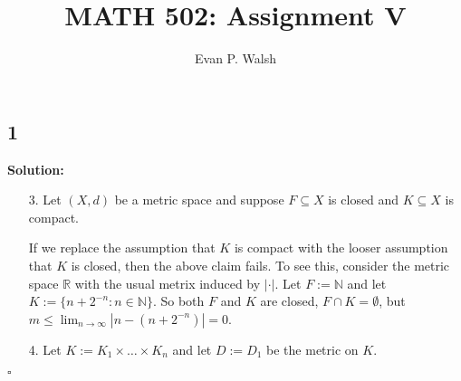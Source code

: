 \documentclass[12pt]{article}
\title{MATH 502: Assignment V}
\author{Evan P. Walsh}
\newcounter{ProofCounter}
\newcounter{ClaimCounter}[ProofCounter]
\newenvironment{Solution}{\stepcounter{ProofCounter}\textbf{Solution:}}{\hfill$\square$}
\newenvironment{claim}[1]{\vspace{1mm}\stepcounter{ClaimCounter}\par\noindent\underline{\bf Claim \theClaimCounter:}\space#1}{}
\newenvironment{claimproof}[1]{\par\noindent\underline{Proof of claim \theClaimCounter:}\space#1}{\hfill $\blacksquare$ Claim \theClaimCounter}
\begin{document}
\maketitle


\subsection*{1}
\begin{Solution}
  \begin{enumerate}
    \item[3.] Let $(X,d)$ be a metric space and suppose $F \subseteq X$ is closed and $K \subseteq X$ is compact.
      

      If we replace the assumption that $K$ is compact with the looser assumption that $K$ is closed, then the above claim fails. To see this,
      consider the metric space $\mathbb{R}$ with the usual metrix induced by $|\cdot |$. Let $F := \mathbb{N}$ and let $K := \{n + 2^{-n}: n \in
      \mathbb{N}\}$. So both $F$ and $K$ are closed, $F \cap K = \emptyset$, but $m \leq \lim_{n\rightarrow\infty}|n - (n+2^{-n})| = 0$.

    \item[4.] Let $K := K_1 \times \dots \times K_{n}$ and let $D := D_1$ be the metric on $K$.


\end{enumerate}
\end{Solution}
\end{document}
